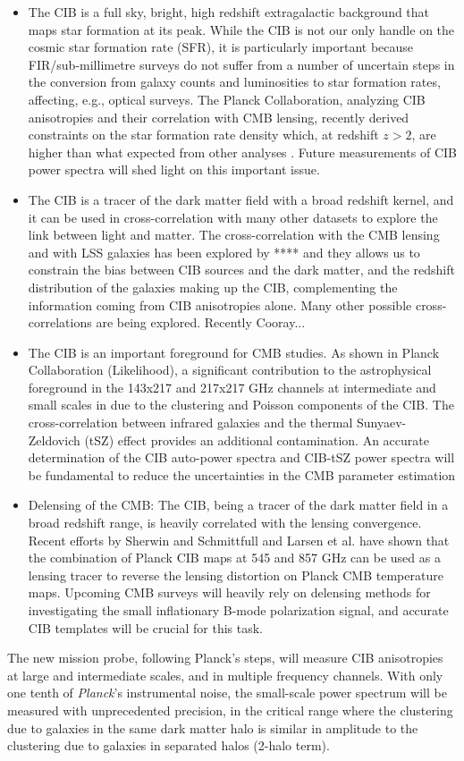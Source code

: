\begin{itemize}
\item The CIB is a full sky, bright, high redshift extragalactic
background that maps star formation at its peak. While the
CIB is not our only handle on the cosmic star formation rate (SFR),
it is particularly important because FIR/sub-millimetre surveys do
not suffer from a number of uncertain steps in the conversion from
galaxy counts and luminosities to star formation rates, affecting, e.g., optical surveys.
The Planck Collaboration, analyzing CIB anisotropies and their correlation with CMB lensing,
recently derived constraints on the star formation rate density which, at redshift $z>2$, are higher
than what expected from other analyses \cite{madau2014}.
Future measurements of CIB power spectra will shed light on this important issue.
\item The CIB is a tracer of the dark matter field with a broad redshift kernel, and it can be
used in cross-correlation with many other datasets to explore the link between light and matter.
The cross-correlation with the CMB lensing and with LSS galaxies has been explored by **** and
they allows us to constrain the bias between CIB sources and the dark matter,
and the redshift distribution of the galaxies making up the CIB, complementing the information coming
from CIB anisotropies alone. Many other possible cross-correlations are being explored. Recently
Cooray...
\item The CIB is an important foreground for CMB studies. As shown in
Planck Collaboration (Likelihood), a significant contribution to the
astrophysical foreground in the 143x217 and 217x217 GHz channels at
intermediate and small scales in due to the clustering and Poisson
components of the CIB. The cross-correlation between infrared galaxies and the thermal
Sunyaev-Zeldovich (tSZ) effect provides an additional contamination. An accurate
determination of the CIB auto-power spectra and CIB-tSZ power spectra will be fundamental to
reduce the uncertainties in the CMB parameter estimation
\item Delensing of the CMB: The CIB, being a tracer of the dark matter field in a broad redshift range,
is heavily correlated with the lensing convergence. Recent efforts by Sherwin and Schmittfull and
Larsen et al. have shown that the combination of Planck CIB maps at 545 and 857 GHz can be used as a
lensing tracer to reverse the lensing distortion on Planck CMB temperature maps. Upcoming CMB surveys
will heavily rely on delensing methods for investigating the small inflationary B-mode polarization signal,
and accurate CIB templates will be crucial for this task.
\end{itemize}
The new mission probe, following Planck’s steps, will measure CIB anisotropies at large and
intermediate scales, and in multiple frequency channels.
With only one tenth of {\it Planck}'s instrumental noise,
the small-scale power spectrum will be measured with unprecedented
precision, in the critical range where the clustering due to galaxies
in the same dark matter halo is similar in amplitude to the clustering
due to galaxies in separated halos (2-halo term).


